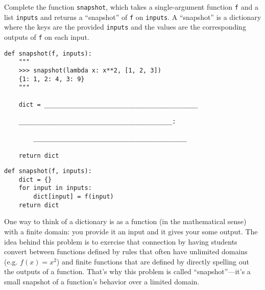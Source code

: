 \begin{blocksection}
\question Complete the function \lstinline{snapshot}, which takes a single-argument function \lstinline{f} and a list \lstinline{inputs} and returns a ``snapshot'' of \lstinline{f} on \lstinline{inputs}. A ``snapshot'' is a dictionary where the keys are the provided \lstinline{inputs} and the values are the corresponding outputs of \lstinline{f} on each input.

\begin{lstlisting}
def snapshot(f, inputs):
    """
    >>> snapshot(lambda x: x**2, [1, 2, 3])
    {1: 1, 2: 4, 3: 9}
    """

    dict = __________________________________________

    __________________________________________:

        __________________________________________
        
    return dict
\end{lstlisting}

\begin{solution}
\begin{lstlisting}
def snapshot(f, inputs):
    dict = {}
    for input in inputs:
        dict[input] = f(input)
    return dict
\end{lstlisting}
\end{solution}
\end{blocksection}

\begin{questionmeta}
One way to think of a dictionary is as a function (in the mathematical sense) with a finite domain: you provide it an input and it gives your some output. The idea behind this problem is to exercise that connection by having students convert between functions defined by rules that often have unlimited domains (e.g. $f(x) = x^2$) and finite functions that are defined by directly spelling out the outputs of a function. That's why this problem is called ``snapshot''---it's a small snapshot of a function's behavior over a limited domain. 
\end{questionmeta}